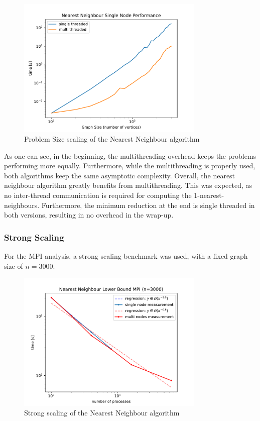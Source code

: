\begin{figure}[H]
  \centering
  \includegraphics[width=0.8\textwidth]{./assets/nn-stmt.pdf}
  \caption{Problem Size scaling of the Nearest Neighbour algorithm}
\end{figure}

As one can see, in the beginning, the multithreading overhead keeps the problems performing more equally. Furthermore, while the multithreading is properly used, both algorithms keep the same asymptotic complexity. Overall, the nearest neighbour algorithm greatly benefits from multithreading. This was expected, as no inter-thread communication is required for computing the 1-nearest-neighbours. Furthermore, the minimum reduction at the end is single threaded in both versions, resulting in no overhead in the wrap-up.

\subsubsection{Strong Scaling}

For the \ac{MPI} analysis, a strong scaling benchmark was used, with a fixed graph size of $n=3000$. 

\begin{figure}[H]
  \centering
  \includegraphics[width=0.8\textwidth]{./assets/NN-mpi.pdf}
  \caption{Strong scaling of the Nearest Neighbour algorithm}
\end{figure}


